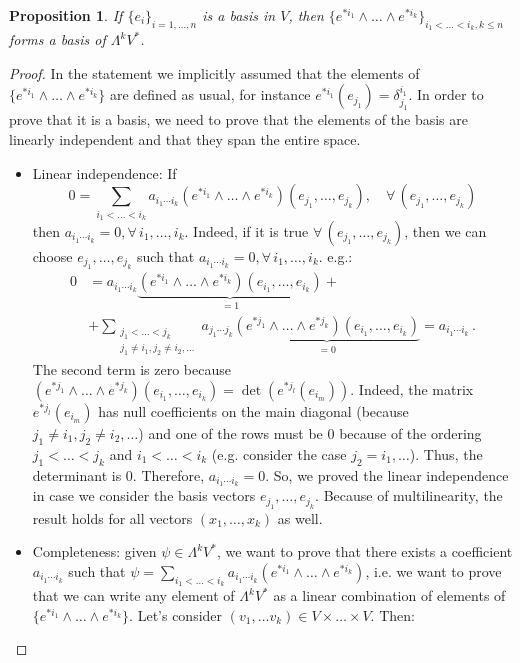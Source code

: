 \documentclass[a4paper,11pt,titlepage, article, oneside]{memoir}
\numberwithin{equation}{section}
\newtheorem{proposition}[theorem]{Proposition}
\theoremstyle{definition}
\theoremstyle{remark}
\begin{document}
\begin{proposition}\label{basisprop1}
  If $\{e_i\}_{i=1,\ldots,n}$ is a basis in $V$, then $\{e^{*i_1} \wedge \ldots \wedge e^{*i_k}\}_{i_1 < \ldots < i_k, k \le n}$ forms a basis of $\Lambda ^k V^*$.
\end{proposition}
\begin{proof}[Proof]
In the statement we implicitly assumed that the elements of $\{e^{*i_1} \wedge \ldots \wedge e^{*i_k}\}$ are defined as usual, for instance $e^{*i_1}(e_{j_1}) = \delta^{i_1}_{j_1}$. In order to prove that it is a basis, we need to prove that the elements of the basis are linearly independent and that they span the entire space.
\begin{itemize}
\item Linear independence: If
$$0 = \sum\limits_{i_1 < \ldots < i_k} a_{i_1 \cdots i_k} (e^{*i_1} \wedge \ldots \wedge e^{*i_k})(e_{j_1}, \ldots, e_{j_k}), \quad \forall \, (e_{j_1}, \ldots, e_{j_k})$$
then $a_{i_1 \cdots i_k} = 0, \forall\, i_1, \ldots, i_k$. Indeed, if it is true $\forall \, (e_{j_1}, \ldots, e_{j_k})$, then we can choose $e_{j_1}, \ldots, e_{j_k}$ such that $a_{i_1 \cdots i_k} = 0, \forall\, i_1, \ldots, i_k$. e.g.:
\begin{align*}
0 &= a_{i_1 \cdots i_k} \underbrace{(e^{*i_1} \wedge \ldots \wedge e^{*i_k}) (e_{i_1}, \ldots, e_{i_k})}_{= 1} + \\
& + \sum\limits_{\substack{j_1 < \ldots < j_k \\
j_1 \not = i_1, j_2 \not = i_2, \ldots}} a_{j_1 \cdots j_k} \underbrace{(e^{*j_1} \wedge \ldots \wedge e^{*j_k}) (e_{i_1}, \ldots, e_{i_k})}_{= 0} = a_{i_1 \cdots i_k} \, .
\end{align*}
The second term is zero because $(e^{*j_1} \wedge \ldots \wedge e^{*j_k}) (e_{i_1}, \ldots, e_{i_k}) = \det \left (e^{*j_l} (e_{i_m}) \right)$. Indeed, the matrix $e^{*j_l} (e_{i_m})$ has null coefficients on the main diagonal (because $j_1 \not = i_1, j_2 \not = i_2, \ldots$) and one of the rows must be 0 because of  the ordering $j_1 < \ldots < j_k$ and $i_1 < \ldots < i_k$ (e.g. consider the case $j_2 = i_1, \ldots$). Thus, the determinant is 0.
Therefore, $a_{i_1 \cdots i_k} = 0$.
So, we proved the linear independence in case we consider the basis vectors $e_{j_1}, \ldots, e_{j_k}$. Because of multilinearity, the result holds for all vectors
 $(x_1, \ldots, x_k)$ as well.
\item Completeness: given $\psi \in \Lambda^k V^*$, we want to prove that there exists a coefficient $a_{i_1 \cdots i_k}$ such that $\psi = \sum\limits_{i_1 < \ldots < i_k} a_{i_1 \cdots i_k} (e^{*i_1} \wedge \ldots \wedge e^{*i_k})$, i.e. we want to prove that we can write any element of $\Lambda^k V^*$ as a linear combination of elements of $\{e^{*i_1} \wedge \ldots \wedge e^{*i_k}\}$. Let's consider $(v_1, \ldots v_k) \in V \times \ldots \times V$. Then:

\end{itemize}
\end{proof}
\end{document}

